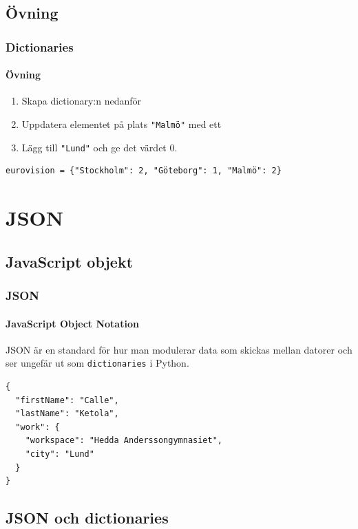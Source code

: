 \documentclass[aspectratio=169]{beamer}
\begin{document}
\subsection{Övning}

\begin{frame}[fragile]
	\frametitle{Dictionaries}
	\framesubtitle{Övning}
	
	\begin{enumerate}
		\item Skapa dictionary:n nedanför
		\item Uppdatera elementet på plats \lstinline{"Malmö"} med ett
		\item Lägg till \lstinline{"Lund"} och ge det värdet 0.
	\end{enumerate}
	
	\begin{lstlisting}
eurovision = {"Stockholm": 2, "Göteborg": 1, "Malmö": 2}
	\end{lstlisting}
	
\end{frame}


\section{JSON}

\subsection{JavaScript objekt}

\begin{frame}[fragile]
\frametitle{JSON}
\framesubtitle{JavaScript Object Notation}

JSON är en standard för hur man modulerar data som skickas mellan datorer och ser ungefär ut som \lstinline{dictionaries} i Python.

\begin{lstlisting}
{
  "firstName": "Calle",
  "lastName": "Ketola",
  "work": {
    "workspace": "Hedda Anderssongymnasiet",
    "city": "Lund" 
  }
}
\end{lstlisting}

\end{frame}

\subsection{JSON och dictionaries}
\end{document}
